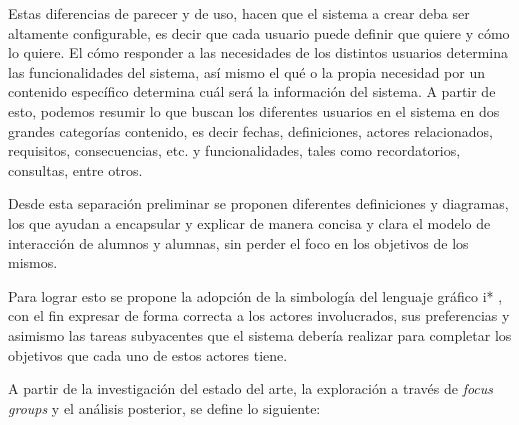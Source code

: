     \par Estas diferencias de parecer y de uso, hacen que el sistema a crear deba ser altamente configurable, es decir que cada usuario puede definir que quiere y cómo lo quiere. El cómo responder a las necesidades de los distintos usuarios determina las funcionalidades del sistema, así mismo el qué o la propia necesidad por un contenido específico determina cuál será la información del sistema. A partir de esto, podemos resumir lo que buscan los diferentes usuarios en el sistema en dos grandes categorías contenido, es decir fechas, definiciones, actores relacionados, requisitos, consecuencias, etc. y funcionalidades, tales como recordatorios, consultas, entre otros.
    \par Desde esta separación preliminar se proponen diferentes definiciones y diagramas, los que ayudan a encapsular y explicar de manera concisa y clara el modelo de interacción de alumnos y alumnas, sin perder el foco en los objetivos de los mismos.
    \par Para lograr esto se propone la adopción de la simbología del lenguaje gráfico \gls{i*} \cite{Dalpiaz2016}, con el fin expresar de forma correcta a los actores involucrados, sus preferencias y asimismo las tareas subyacentes que el sistema debería realizar para completar los objetivos que cada uno de estos actores tiene.
    \par A partir de la investigación del estado del arte, la exploración a través de \textit{focus groups} y el análisis posterior, se define lo siguiente:
    
